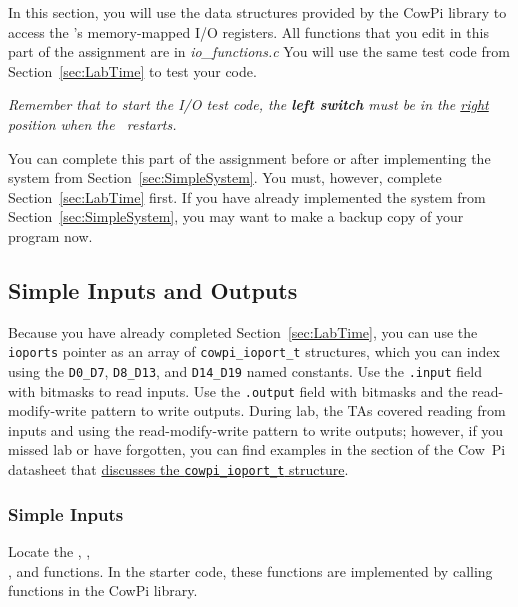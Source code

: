 In this section, you will use the data structures provided by the CowPi library to access the \developmentboard's memory-mapped I/O registers.
All functions that you edit in this part of the assignment are in \textit{io\_functions.c}
You will use the same test code from Section~\ref{sec:LabTime} to test your code.

\textit{Remember that to start the I/O test code, the \textbf{left switch} must be in the \underline{right} position when the \developmentboard\ restarts.}

You can complete this part of the assignment before or after implementing the system from Section~\ref{sec:SimpleSystem}.
You must, however, complete Section~\ref{sec:LabTime} first.
If you have already implemented the system from Section~\ref{sec:SimpleSystem}, you may want to make a backup copy of your program now.


\subsection{Simple Inputs and Outputs} \label{subsec:simpleIO}

Because you have already completed Section~\ref{sec:LabTime}, you can use the \lstinline{ioports} pointer as an array of \lstinline{cowpi_ioport_t} structures, which you can index using the \lstinline{D0_D7}, \lstinline{D8_D13}, and \lstinline{D14_D19} named constants.
Use the \lstinline{.input} field with bitmasks to read inputs.
Use the \lstinline{.output} field with bitmasks and the read-modify-write pattern to write outputs.
During lab, the TAs covered reading from inputs and using the read-modify-write pattern to write outputs;
however, if you missed lab or have forgotten, you can find examples in the section of the Cow~Pi datasheet that \href{https://cow-pi.readthedocs.io/en/latest/microcontroller.html#structure-for-memory-mapped-input-output}{discusses the \lstinline{cowpi_ioport_t} structure}.

\subsubsection{Simple Inputs}

Locate the , , \\ , and   functions.
In the starter code, these functions are implemented by calling functions in the CowPi library.

